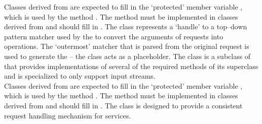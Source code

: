 Classes derived from  are expected to
fill in the `protected' member variable , which
is used by the method .
The method  must be implemented in classes derived from
 and should fill in
.
The  class represents a
`handle' to a top--down pattern matcher used by the
 to convert the arguments of
 requests into 
operations.
The `outermost' matcher that is parsed from the original request is used to generate the
 -- the  class acts as a placeholder.
\secondaryEnd{}
The 
class is a subclass of 
that provides implementations of several of the required methods of its superclass and is
specialized to only support input streams.\\

Classes derived from  are expected to
fill in the `protected' member variable , which is
used by the method .
The method  must be implemented in classes derived from
 and should fill in
.
The  class is
designed to provide a consistent request handling mechanism for \mplusm{} services.\\

